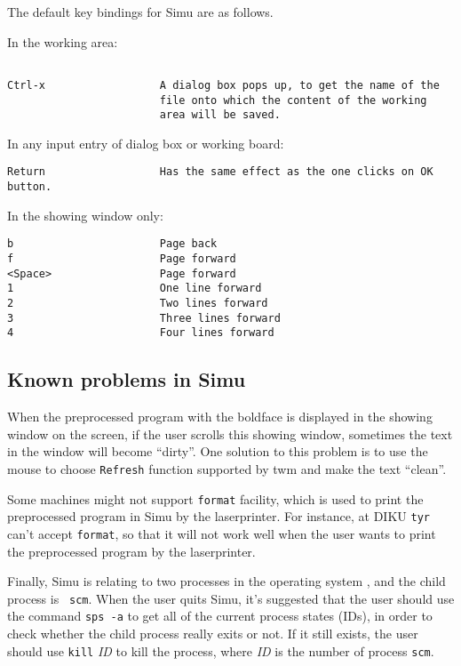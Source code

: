 \begin{sloppypar}
   The default key bindings for Simu are as follows.

   In the working area:

\begin{verbatim}

Ctrl-x                  A dialog box pops up, to get the name of the
                        file onto which the content of the working
                        area will be saved.
\end{verbatim}

   In any input entry of dialog box or working board:

\begin{verbatim}
Return                  Has the same effect as the one clicks on OK button.
\end{verbatim}

   In the showing window only:

\begin{verbatim}
b                       Page back
f                       Page forward
<Space>                 Page forward
1                       One line forward
2                       Two lines forward
3                       Three lines forward
4                       Four lines forward
\end{verbatim}

\subsection{Known problems in Simu}

When the preprocessed program with the boldface is displayed in the
showing window on the screen, if the user scrolls this showing window,
sometimes the text in the window will become ``dirty''. One solution
to this problem is to use the mouse to choose {\tt Refresh} function
supported by twm and make the text ``clean''.

Some machines might not support {\tt format} facility, which is used
to print the preprocessed program in Simu by the laserprinter. For
instance, at DIKU {\tt tyr} can't accept {\tt format}, so that it will
not work well when the user wants to print the preprocessed program by
the laserprinter.

Finally, Simu is relating to two processes in the operating system
\cite{BellLaboratories:83,YoungPew:92}, and the child process is {\tt
scm}. When the user quits Simu, it's suggested that the user should
use the command {\tt sps -a} to get all of the current process states
(IDs), in order to check whether the child process really exits or
not. If it still exists, the user should use {\tt kill} {\it ID} to
kill the process, where {\it ID} is the number of process {\tt scm}.



\end{sloppypar}
